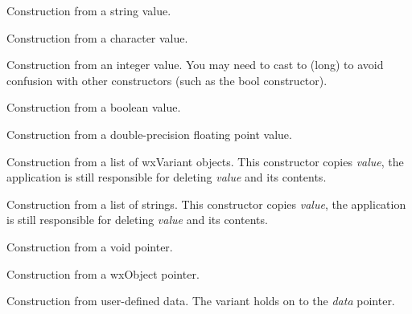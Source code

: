 

Construction from a string value.


Construction from a character value.


Construction from an integer value. You may need to cast to (long) to
avoid confusion with other constructors (such as the bool constructor).


Construction from a boolean value.


Construction from a double-precision floating point value.


Construction from a list of wxVariant objects. This constructor
copies {\it value}, the application is still responsible for
deleting {\it value} and its contents.


Construction from a list of strings. This constructor
copies {\it value}, the application is still responsible for
deleting {\it value} and its contents.


Construction from a void pointer.


Construction from a wxObject pointer.


Construction from user-defined data. The variant holds on to the {\it data} pointer.

\label{wxvariantdtor}

